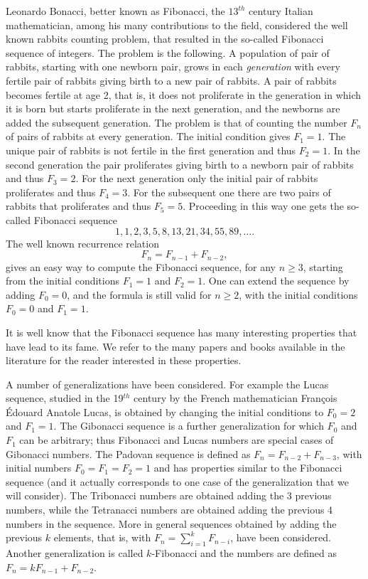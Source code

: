 \documentclass[11pt,epsf]{article}
\begin{document}
Leonardo Bonacci, better known as Fibonacci, the $13^{th}$ century Italian mathematician, among
his many contributions to the field, considered
the well known rabbits counting problem, that resulted in the so-called Fibonacci sequence
of integers. The problem is the following. A population of pair of rabbits, starting with one newborn pair, grows
in each {\em generation} with every fertile pair of rabbits giving birth to a new pair of rabbits.
A pair of rabbits becomes fertile at age 2, that is, it does not proliferate in the generation in which it
is born but starts proliferate in the next generation, and the newborns are added the subsequent
generation. The problem is that of counting the number $F_n$ of pairs of rabbits at every generation.
The initial condition gives $F_1=1$. The unique pair of rabbits is not fertile in the first generation and thus $F_2=1$.
In the second generation the pair proliferates giving birth to a newborn pair of rabbits and thus $F_3=2$.
For the next generation only the initial pair of rabbits proliferates and thus $F_4=3$. For the subsequent one
there are two pairs of rabbits that proliferates and thus $F_5=5$. Proceeding in this way one gets the
so-called Fibonacci sequence
$$1,1,2,3,5,8,13,21,34,55,89,\ldots.$$
The well known recurrence relation
\begin{equation}\label{eq:fibonacci}
F_n=F_{n-1}+F_{n-2},
\end{equation}
gives an easy way to compute the Fibonacci sequence, for any $n\ge 3$, starting from the initial conditions
$F_1=1$ and $F_2=1$. One can extend the sequence by adding $F_0=0$, and the formula
is still valid for $n\ge 2$, with the initial conditions $F_0=0$ and $F_1=1$.

It is well know that the Fibonacci sequence has many interesting properties that have lead to its fame.
We refer to the many papers and books available in the literature for the reader interested in these properties.

\medskip

A number of generalizations have been considered. For example the Lucas sequence, studied
in the 19$^{th}$ century by the French mathematician François Édouard Anatole Lucas, is
obtained by changing the initial conditions to $F_0=2$ and $F_1=1$.
The Gibonacci sequence is a further generalization for which $F_0$ and $F_1$ can be arbitrary;
thus Fibonacci and Lucas numbers are special cases of Gibonacci numbers. 
The Padovan sequence is defined as $F_n=F_{n-2}+F_{n-3}$, with initial numbers $F_0=F_1=F_2=1$ and
has properties similar to the Fibonacci sequence (and it actually corresponds to  one case of the generalization that we will consider).
The Tribonacci numbers are obtained adding the 3 previous numbers, while the Tetranacci numbers
are obtained adding the previous 4 numbers in the sequence. More in general sequences
obtained by adding the previous $k$ elements, that is, with $F_n=\sum_{i=1}^k F_{n-i}$, have been considered.
Another generalization is called $k$-Fibonacci and the numbers are defined as $F_n=k F_{n-1}+F_{n-2}$.
\end{document}
